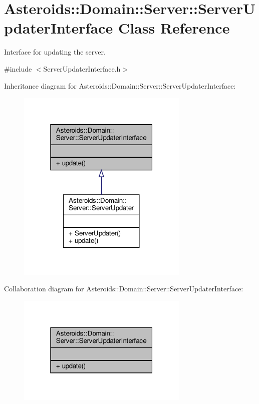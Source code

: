 \hypertarget{classAsteroids_1_1Domain_1_1Server_1_1ServerUpdaterInterface}{}\section{Asteroids\+:\+:Domain\+:\+:Server\+:\+:Server\+Updater\+Interface Class Reference}
\label{classAsteroids_1_1Domain_1_1Server_1_1ServerUpdaterInterface}


Interface for updating the server.  




{\ttfamily \#include $<$Server\+Updater\+Interface.\+h$>$}



Inheritance diagram for Asteroids\+:\+:Domain\+:\+:Server\+:\+:Server\+Updater\+Interface\+:\nopagebreak
\begin{figure}[H]
\begin{center}
\leavevmode
\includegraphics[width=232pt]{classAsteroids_1_1Domain_1_1Server_1_1ServerUpdaterInterface__inherit__graph}
\end{center}
\end{figure}


Collaboration diagram for Asteroids\+:\+:Domain\+:\+:Server\+:\+:Server\+Updater\+Interface\+:\nopagebreak
\begin{figure}[H]
\begin{center}
\leavevmode
\includegraphics[width=232pt]{classAsteroids_1_1Domain_1_1Server_1_1ServerUpdaterInterface__coll__graph}
\end{center}
\end{figure}
